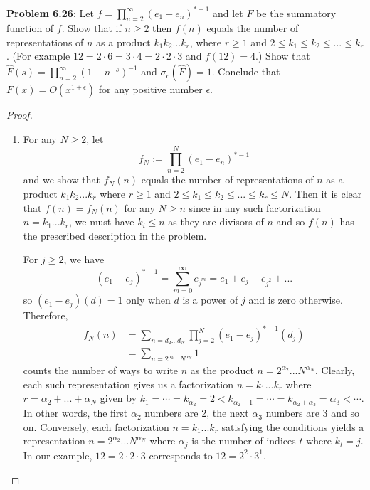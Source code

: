 \documentclass[12pt]{article}
\newcommand{\Fhat}{\widehat{F}}
\begin{document}
\fi

\textbf{Problem 6.26}: Let $f = \prod_{n=2}^{\infty} (e_1 - e_n)^{*-1}$ and let $F$ be the summatory function of $f$. Show that if $n \geq 2$ then $f(n)$ equals the number of representations of $n$ as a product $k_1 k_2 ... k_r$, where $r \geq 1$ and $2 \leq k_1 \leq k_2 \leq ... \leq k_r$. (For example $12 = 2 \cdot 6 = 3 \cdot 4 = 2 \cdot 2 \cdot 3$ and $f(12) = 4$.) Show that $\Fhat(s) = \prod_{n=2}^{\infty} (1 - n^{-s})^{-1}$ and $\sigma_c(\Fhat) = 1$. Conclude that $F(x) = O(x^{1 + \epsilon})$ for any positive number $\epsilon$.

\begin{proof}
\begin{enumerate}
\item  For any $N \geq 2$, let
$$f_N := \prod_{n=2}^{N} (e_1 - e_n)^{*-1}$$
and we show that $f_N(n)$ equals the number of representations of $n$ as a product $k_1 k_2 ... k_r$ where $r \geq 1$ and $2 \leq k_1 \leq k_2 \leq ... \leq k_r \leq N$. Then it is clear that $f(n) = f_N(n)$ for any $N \geq n$ since in any such factorization $n = k_1 ... k_r$, we must have $k_i \leq n$ as they are divisors of $n$ and so $f(n)$ has the prescribed description in the problem.

For $j \geq 2$, we have
$$(e_1 - e_j)^{*-1} = \sum_{m = 0}^{\infty} e_{j^m} = e_1 + e_j + e_{j^2} + ...$$
so $(e_1 - e_j)(d) = 1$ only when $d$ is a power of $j$ and is zero otherwise. Therefore,
\begin{align*}
f_N(n) &= \sum_{n = d_2 ... d_N} \prod_{j = 2}^N (e_1 - e_j)^{*-1}(d_j)\\
&= \sum_{n = 2^{\alpha_2} ... N^{\alpha_N}} 1
\end{align*}
counts the number of ways to write $n$ as the product $n = 2^{\alpha_2} ... N^{\alpha_N}$. Clearly, each such representation gives us a factorization $n = k_1 ... k_r$ where $r = \alpha_2 + ... + \alpha_N$ given by $k_1 = \cdots = k_{\alpha_2} = 2 < k_{\alpha_2 + 1} = \cdots = k_{\alpha_2 + \alpha_3} = \alpha_3 < \cdots$. In other words, the first $\alpha_2$ numbers are 2, the next $\alpha_3$ numbers are 3 and so on. Conversely, each factorization $n = k_1 ... k_r$ satisfying the conditions yields a representation $n = 2^{\alpha_2} ... N^{\alpha_N}$ where $\alpha_j$ is the number of indices $t$ where $k_t = j$. In our example, $12 = 2 \cdot 2 \cdot 3$ corresponds to $12 = 2^2 \cdot 3^1$.


\end{enumerate}
\end{proof}
\end{document}
